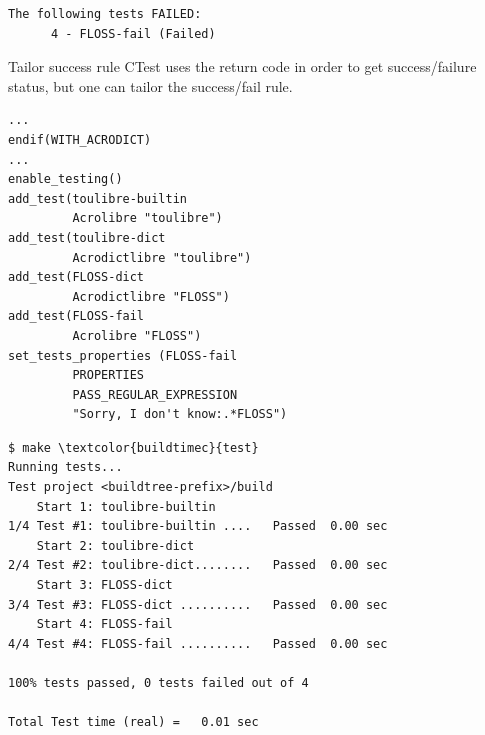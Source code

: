 \documentclass[compress,slidestop,table
              ]
               {beamer}
\begin{document}
\begin{frame}
\begin{multicols}{2}
\begin{Verbatim}[commandchars=\\\{\},fontsize=\tiny]
The following tests FAILED:
	  4 - FLOSS-fail (Failed)
\end{Verbatim}
\end{multicols}
\vspace*{-0.4cm}
\begin{block}{Tailor success rule}
CTest uses the return code in order to get success/failure status, but
one can tailor the success/fail rule.
\end{block}
\vspace*{-0.7cm}
\begin{multicols}{2}
\begin{lstlisting}[escapechar={§},basicstyle=\tiny,caption=add CTest support]
...
endif(WITH_ACRODICT)
...
enable_testing()
add_test(toulibre-builtin
         Acrolibre "toulibre")
add_test(toulibre-dict
         Acrodictlibre "toulibre")
add_test(FLOSS-dict
         Acrodictlibre "FLOSS")
add_test(FLOSS-fail
         Acrolibre "FLOSS")
set_tests_properties (FLOSS-fail
         PROPERTIES
         PASS_REGULAR_EXPRESSION
         "Sorry, I don't know:.*FLOSS")
\end{lstlisting}
\columnbreak
\begin{Verbatim}[commandchars=\\\{\},fontsize=\tiny]
$ make \textcolor{buildtimec}{test}
Running tests...
Test project <buildtree-prefix>/build
    Start 1: toulibre-builtin
1/4 Test #1: toulibre-builtin ....   Passed  0.00 sec
    Start 2: toulibre-dict
2/4 Test #2: toulibre-dict........   Passed  0.00 sec
    Start 3: FLOSS-dict
3/4 Test #3: FLOSS-dict ..........   Passed  0.00 sec
    Start 4: FLOSS-fail
4/4 Test #4: FLOSS-fail ..........   Passed  0.00 sec

100% tests passed, 0 tests failed out of 4

Total Test time (real) =   0.01 sec
\end{Verbatim}
\end{multicols}
\end{frame}
\end{document}
